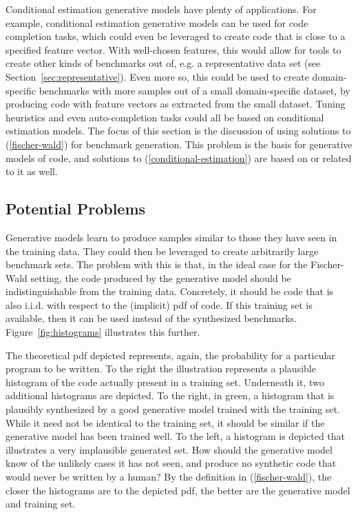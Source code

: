 Conditional estimation generative models have plenty of applications.
For example, conditional estimation generative models can be used for code completion tasks, which could even be leveraged to create code that is close to a specified feature vector.
With well-chosen features, this would allow for tools to create other kinds of benchmarks out of, e.g. a representative data set (see Section~\ref{sec:representative}). 
Even more so, this could be used to create domain-specific benchmarks with more samples out of a small domain-specific dataset, by producing code with feature vectors as extracted from the small dataset.
Tuning heuristics and even auto-completion tasks could all be based on conditional estimation models.
The focus of this section is the discussion of using solutions to (\ref{fischer-wald}) for benchmark generation.
This problem is the basis for generative models of code, and solutions to (\ref{conditional-estimation}) are based on or related to it as well.

\subsection{Potential Problems}
\label{sec:potential_problems}
Generative models learn to produce samples similar to those they have seen in the training data. They could then be leveraged to create arbitrarily large benchmark sets.
The problem with this is that, in the ideal case for the Fischer-Wald setting, the code produced by the generative model should be indistinguishable from the training data.
Concretely, it should be code that is also i.i.d. with respect to the (implicit) pdf of code.
If this training set is available, then it can be used instead of the synthesized benchmarks.
Figure~\ref{fig:histograms} illustrates this further.

The theoretical \ac{pdf} depicted represents, again, the probability for a particular program to be written.
To the right the illustration represents a plausible histogram of the code actually present in a training set.
Underneath it, two additional histograms are depicted. To the right, in green, a histogram that is plausibly synthesized by a good generative model trained with the training set.
While it need not be identical to the training set, it should be similar if the generative model has been trained well.
To the left, a histogram is depicted that illustrates a very implausible generated set.
How should the generative model know of the unlikely cases it has not seen, and produce no synthetic code that would never be written by a human?
By the definition in (\ref{fischer-wald}), the closer the histograms are to the depicted pdf, the better are the generative model and training set.

